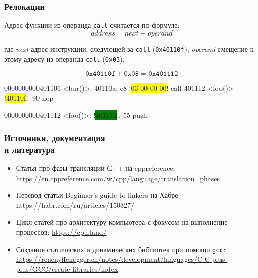 \documentclass[compress, 10pt, aspectratio=169]{beamer}
\begin{document}
\begin{frame}[fragile]

    \frametitle{Релокации}

    Адрес функции из операнда \texttt{call} считается по формуле:
    \begin{equation*}
        address = next + operand
    \end{equation*}

    где \textit{next} \textemdash \space адрес инструкции,
    следующей за \texttt{call} (\texttt{0x40110f});
    \textit{operand} \textemdash \space смещение к этому адресу
    из операнда \texttt{call} (\texttt{0x03}).

    \begin{equation*}
        \texttt{0x40110f} + \texttt{0x03} = \texttt{0x401112}
    \end{equation*}

    \begin{terminalwindow}
0000000000401106 <bar()>:
  40110a:       e8 !\colorbox{yellow}{03 00 00 00}!         call   401112 <foo()>
  !\colorbox{yellow}{40110f}!:      90                      nop

0000000000401112 <foo()>:
  !\colorbox{green}{401112}!:       55                      push   %
    \end{terminalwindow}

\end{frame}

\begin{frame}[fragile]

    \frametitle{Источники, документация \\ и литература}

    \begin{itemize}

        \item Статья про фазы трансляции С++ на cppreference:
            \url{https://en.cppreference.com/w/cpp/language/translation\_phases}

        \item Перевод статьи Beginner's guide to linkers на Хабре:
            \url{https://habr.com/ru/articles/150327/}

        \item Цикл статей про архитектуру компьютера с фокусом на выполнение
            процессов: \url{https://cpu.land/}

        \item Создание статических и динамических библиотек при помощи
            \texttt{gcc}: \url{https://renenyffenegger.ch/notes/development/languages/C-C-plus-plus/GCC/create-libraries/index}

    \end{itemize}

\end{frame}
\end{document}
